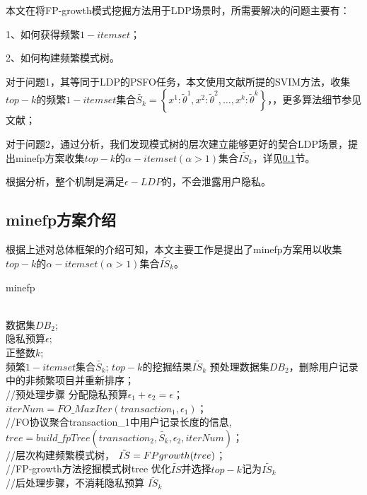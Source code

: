\documentclass[UTF8]{ctexart}
\begin{document}
本文在将FP-growth模式挖掘方法用于LDP场景时，所需要解决的问题主要有：

1、如何获得频繁$1-itemset$；

2、如何构建频繁模式树。

对于问题1，其等同于LDP的PSFO任务，本文使用文献\cite{wang2018locally}所提的SVIM方法，收集$top-k$的频繁$1-itemset$集合$\tilde{S_k}=\left\{x^{1}: \tilde{\theta}^{1}, x^{2}: \tilde{\theta}^{2}, \ldots, x^{k}: \tilde{\theta}^{k}\right\}$，，更多算法细节参见文献；

对于问题2，通过分析，我们发现模式树的层次建立能够更好的契合LDP场景，提出minefp方案收集$top-k$的$\alpha -itemset(\alpha>1)$集合$\tilde{IS_k}$，详见\ref{section:minefp}节。

根据分析，整个机制是满足$\epsilon-LDP$的，不会泄露用户隐私。

\subsection{minefp方案介绍}
\label{section:minefp}
根据上述对总体框架的介绍可知，本文主要工作是提出了minefp方案用以收集$top-k$的$\alpha -itemset(\alpha>1)$集合$\tilde{IS_k}$。

\begin{algorithm}[ht]
    \caption{minefp}
    \label{alg:minefp}
        \begin{algorithmic}[1]
			 \REQUIRE ~~\\
			 数据集$DB_2$;\\
			 隐私预算$\epsilon$;\\
			 正整数$k$;\\
			 频繁$1-itemset$集合$\tilde{S_k}$;
			 \ENSURE $top-k$的挖掘结果$\tilde{IS_k}$
                 \STATE 预处理数据集$DB_2$，删除用户记录中的非频繁项目并重新排序；\\//预处理步骤
                 \label{minefp:preprocessing} 
                 \STATE 分配隐私预算$\epsilon_1 + \epsilon_2 = \epsilon$；
                 \label{minefp:epsilon}            
			 \STATE $iterNum = FO\_MaxIter(transaction_1,\epsilon_1)$； \\ //FO协议聚合transaction\_1中用户记录长度的信息,%
			 \label{minefp:iterNum}
			 \STATE $tree = build\_fpTree(transaction_2,\tilde{S_k},\epsilon_2,iterNum)$； \\ //层次构建频繁模式树，%
			 \label{minefp:tree}
			 \STATE $\tilde{IS} = FP\-growth(tree)$； \\ //FP-growth方法挖掘模式树tree
                 \label{minefp:fpgrowth}
			 \STATE 优化$\tilde{IS}$并选择$top-k$记为$\tilde{IS_k}$ \\ //后处理步骤，不消耗隐私预算
                 \label{minefp:optimize}
                 \RETURN $\tilde{IS_k}$
        \end{algorithmic}
\end{algorithm}
\end{document}
